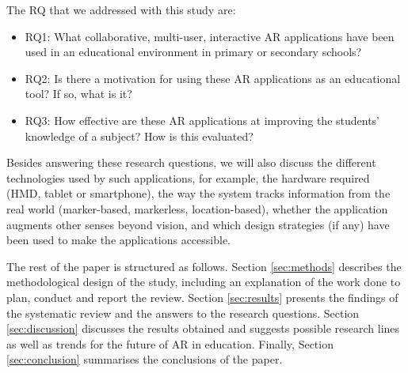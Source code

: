 The \gls{RQ} that we addressed with this study are:
\begin{itemize}
    \item \gls{RQ}1: What collaborative, multi-user, interactive \gls{AR} applications have been used in an educational environment in primary or secondary schools?
    \item \gls{RQ}2: Is there a motivation for using these \gls{AR} applications as an educational tool? If so, what is it?
    \item \gls{RQ}3: How effective are these \gls{AR} applications at improving the students' knowledge of a subject? How is this evaluated?
\end{itemize}

Besides answering these research questions, we will also discuss the different technologies used by such applications, for example, the hardware required (\gls{HMD}, tablet or smartphone), the way the system tracks information from the real world (marker-based, markerless, location-based), whether the application augments other senses beyond vision, and which design strategies (if any) have been used to make the applications accessible.

The rest of the paper is structured as follows. Section \ref{sec:methods} describes the methodological design of the study, including an explanation of the work done to plan, conduct and report the review. Section \ref{sec:results} presents the findings of the systematic review and the answers to the research questions. Section \ref{sec:discussion} discusses the results obtained and suggests possible research lines as well as trends for the future of AR in education. Finally, Section \ref{sec:conclusion} summarises the conclusions of the paper.
